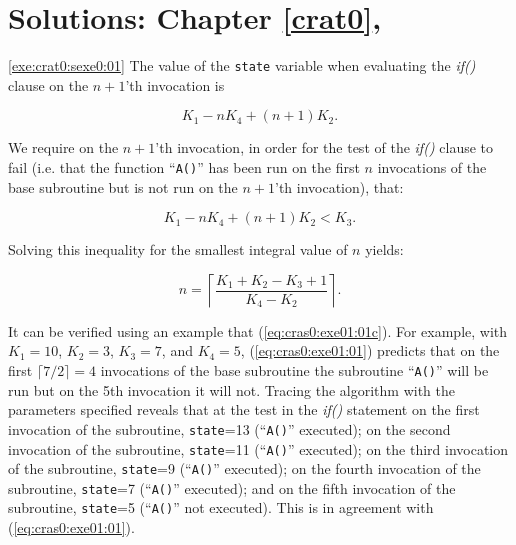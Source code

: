 \chapter[Solutions: Chapter \ref{crat0}]
        {Solutions: Chapter \ref{crat0}, \cratzerolongtitle{}}

\label{cras0}

\vworkexercisechapterheader{}
\begin{vworkexercisesolution}{\ref{exe:crat0:sexe0:01}}
The value of the \texttt{state} variable when 
evaluating the \emph{if()} clause on the
$n+1$'th invocation is

\begin{equation}
\label{eq:cras0:exe01:01}
K_1 - nK_4 + (n+1) K_2 .
\end{equation}

We require on the $n+1$'th invocation, in order for the 
test of the \emph{if()} clause to fail (i.e. that the function
``\texttt{A()}'' has been run on the first $n$ invocations of
the base subroutine but is not run on the $n+1$'th invocation), 
that:

\begin{equation}
\label{eq:cras0:exe01:01b}
K_1 - nK_4 + (n+1) K_2 < K_3.
\end{equation}

Solving this inequality for the smallest integral
value of $n$ yields:

\begin{equation}
\label{eq:cras0:exe01:01c}
n = \left\lceil
\frac{K_1 + K_2 - K_3 + 1}{K_4 - K_2}
\right\rceil .
\end{equation}

It can be verified using an example that 
(\ref{eq:cras0:exe01:01c}).  For example, with
$K_1 = 10$, $K_2 = 3$, $K_3 = 7$, and $K_4 = 5$, 
(\ref{eq:cras0:exe01:01}) predicts that on the first
$\lceil 7/2 \rceil = 4$ invocations of the base subroutine
the subroutine ``\texttt{A()}'' will be run but on the 5th
invocation it will not.  Tracing the algorithm with the
parameters specified reveals that at the
test in the \emph{if()} statement 
on the first invocation of the
subroutine, \texttt{state}=13 (``\texttt{A()}'' executed);
on the second invocation of the
subroutine, \texttt{state}=11 (``\texttt{A()}'' executed);
on the third invocation of the
subroutine, \texttt{state}=9 (``\texttt{A()}'' executed);
on the fourth invocation of the
subroutine, \texttt{state}=7 (``\texttt{A()}'' executed);
and on the fifth invocation of the
subroutine, \texttt{state}=5 (``\texttt{A()}'' not executed).
This is in agreement with
(\ref{eq:cras0:exe01:01}). 
\end{vworkexercisesolution}
\vworkexercisechapterfooter



